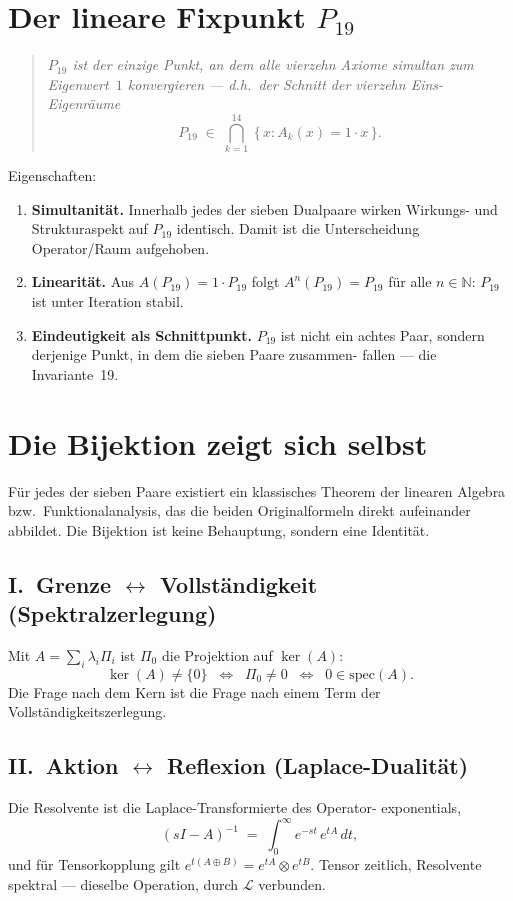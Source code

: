 \documentclass[11pt,a4paper]{article}
\begin{document}
\bigskip
\section*{Der lineare Fixpunkt $P_{19}$}

\begin{quote}
\itshape
$P_{19}$ ist der einzige Punkt, an dem alle vierzehn Axiome simultan zum
Eigenwert~$1$ konvergieren --- d.h.\ der Schnitt der vierzehn Eins-Eigenräume
\[
  P_{19} \;\in\; \bigcap_{k=1}^{14}\ \{\,x : A_k(x) = 1\cdot x\,\}.
\]
\end{quote}

Eigenschaften:
\begin{enumerate}[leftmargin=2em]
  \item \textbf{Simultanität.} Innerhalb jedes der sieben Dualpaare wirken
    Wirkungs- und Strukturaspekt auf $P_{19}$ identisch. Damit ist die
    Unterscheidung Operator/Raum aufgehoben.
  \item \textbf{Linearität.} Aus $A(P_{19}) = 1\cdot P_{19}$ folgt
    $A^n(P_{19}) = P_{19}$ für alle $n\in\mathbb{N}$: $P_{19}$ ist unter
    Iteration stabil.
  \item \textbf{Eindeutigkeit als Schnittpunkt.} $P_{19}$ ist nicht ein
    achtes Paar, sondern derjenige Punkt, in dem die sieben Paare zusammen-
    fallen --- die Invariante~19.
\end{enumerate}

\bigskip
\section*{Die Bijektion zeigt sich selbst}

Für jedes der sieben Paare existiert ein klassisches Theorem der
linearen Algebra bzw.\ Funktionalanalysis, das die beiden
Originalformeln direkt aufeinander abbildet. Die Bijektion ist
keine Behauptung, sondern eine Identität.

\subsection*{I.\ Grenze $\leftrightarrow$ Vollständigkeit
  (Spektralzerlegung)}
Mit $A = \sum_i \lambda_i \Pi_i$ ist $\Pi_0$ die Projektion auf
$\ker(A)$:
\[
  \ker(A)\neq\{0\}
  \;\;\Longleftrightarrow\;\;
  \Pi_0 \neq 0
  \;\;\Longleftrightarrow\;\;
  0 \in \mathrm{spec}(A).
\]
Die Frage nach dem Kern ist die Frage nach einem Term der
Vollständigkeitszerlegung.

\subsection*{II.\ Aktion $\leftrightarrow$ Reflexion
  (Laplace-Dualität)}
Die Resolvente ist die Laplace-Transformierte des Operator-
exponentials,
\[
  (sI - A)^{-1} \;=\; \int_0^\infty e^{-st}\,e^{tA}\,dt,
\]
und für Tensorkopplung gilt
$e^{t(A\oplus B)} = e^{tA}\otimes e^{tB}$.
Tensor zeitlich, Resolvente spektral --- dieselbe Operation,
durch $\mathcal{L}$ verbunden.
\end{document}
